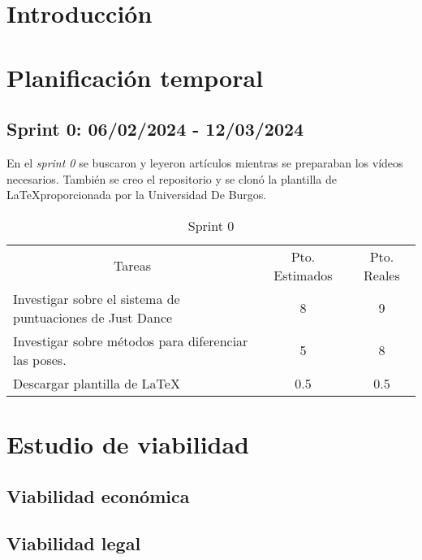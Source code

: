 
\section{Introducción}

\section{Planificación temporal}

\subsection{Sprint 0: 06/02/2024 - 12/03/2024}
En el \textit{sprint 0} se buscaron y leyeron artículos mientras se preparaban los vídeos necesarios. También se creo el repositorio y se clonó la plantilla de \LaTeX proporcionada por la Universidad De Burgos.

\begin{table}[H]
	\begin{tabular}{lcc}
		\multicolumn{1}{c}{Tareas} & Pto. Estimados & Pto. Reales\\
		Investigar sobre el sistema de puntuaciones de Just Dance & 8 & 9 \\
	 	Investigar sobre métodos para diferenciar las poses. & 5 & 8 \\
	 	Descargar plantilla de \LaTeX & 0.5 & 0.5 \\
	\end{tabular}
\caption{Sprint 0}
\label{sprint0}
\end{table}

\section{Estudio de viabilidad}

\subsection{Viabilidad económica}

\subsection{Viabilidad legal}


